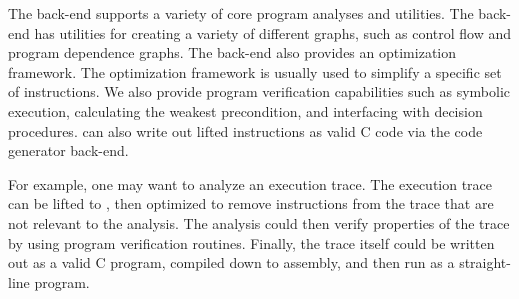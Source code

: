 The \bap back-end supports a variety of core program analyses
and utilities.  The back-end has utilities for creating a variety of
different graphs, such as control flow and program dependence graphs.
The back-end also provides an optimization framework. The optimization
framework is usually used to simplify a specific set of
instructions. We also provide program verification capabilities such
as symbolic execution, calculating the weakest precondition, and
interfacing with decision procedures.  \bap can also write out lifted
\bap instructions as valid C code via the code generator back-end.


For example, one may want to analyze an execution trace. The execution
trace can be lifted to \bap, then optimized to remove
instructions from the trace that are not relevant to the analysis.
The analysis could then verify properties of the trace by using
program verification routines. Finally, the trace itself could be
written out as a valid C program, compiled down to assembly, and then
run as a straight-line program.


